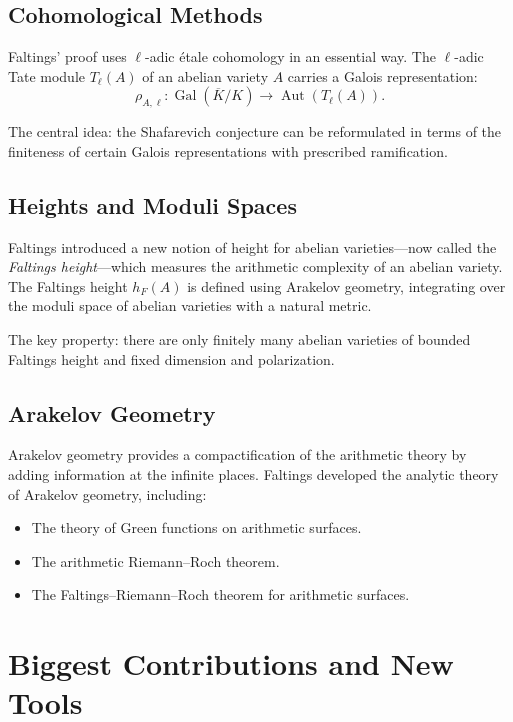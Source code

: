 \subsection{Cohomological Methods}

Faltings' proof uses $\ell$-adic \'etale cohomology in an essential way. The $\ell$-adic Tate module $T_\ell(A)$ of an abelian variety $A$ carries a Galois representation:
\[
\rho_{A,\ell}: \operatorname{Gal}(\overline{K}/K) \to \operatorname{Aut}(T_\ell(A)).
\]

The central idea: the Shafarevich conjecture can be reformulated in terms of the finiteness of certain Galois representations with prescribed ramification.

\subsection{Heights and Moduli Spaces}

Faltings introduced a new notion of height for abelian varieties---now called the \emph{Faltings height}---which measures the arithmetic complexity of an abelian variety. The Faltings height $h_F(A)$ is defined using Arakelov geometry, integrating over the moduli space of abelian varieties with a natural metric.

The key property: there are only finitely many abelian varieties of bounded Faltings height and fixed dimension and polarization.

\subsection{Arakelov Geometry}

Arakelov geometry provides a compactification of the arithmetic theory by adding information at the infinite places. Faltings developed the analytic theory of Arakelov geometry, including:
\begin{itemize}
\item The theory of Green functions on arithmetic surfaces.
\item The arithmetic Riemann--Roch theorem.
\item The Faltings--Riemann--Roch theorem for arithmetic surfaces.
\end{itemize}

\section{Biggest Contributions and New Tools}

